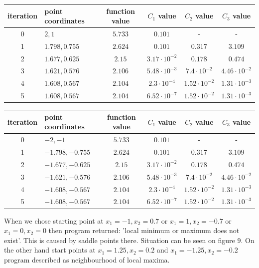 \documentclass[12pt]{article}
\begin{document}
	\begin{table}[H]
		\begin{tabularx}{\textwidth}{c|X|c|c|c|c|}
			iteration & point coordinates & function value & $C_1$ value & $C_2$ value & $C_3$ value\\
			\hline
			0 & $2, 1$ & $5.733$ & $0.101$ & - & - \\
			\hline
			1 & $1.798, 0.755$ & $2.624$ & $0.101$ & $0.317$ & $3.109$ \\
			\hline
			2 & $1.677, 0.625$ & $2.15$ & $3.17\cdot10^{-2}$ & $0.178$ & $0.474$ \\
			\hline
			3 & $1.621, 0.576$ & $2.106$ & $5.48\cdot10^{-3}$ & $7.4\cdot10^{-2}$ & $4.46\cdot10^{-2}$ \\
			\hline
			4 & $1.608, 0.567$ & $2.104$ & $2.3\cdot10^{-4}$ & $1.52\cdot10^{-2}$ & $1.31\cdot10^{-3}$ \\
			\hline
			5 & $1.608, 0.567$ & $2.104$ & $6.52\cdot10^{-7}$ & $1.52\cdot10^{-2}$ & $1.31\cdot10^{-3}$ \\
			\hline
						
 		\end{tabularx}	
	\end{table}

	\begin{table}[H]
		\begin{tabularx}{\textwidth}{c|X|c|c|c|c|}
			iteration & point coordinates & function value & $C_1$ value & $C_2$ value & $C_3$ value\\
			\hline
			0 & $-2, -1$ & $5.733$ & $0.101$ & - & - \\
			\hline
			1 & $-1.798, -0.755$ & $2.624$ & $0.101$ & $0.317$ & $3.109$ \\
			\hline
			2 & $-1.677, -0.625$ & $2.15$ & $3.17\cdot10^{-2}$ & $0.178$ & $0.474$ \\
			\hline
			3 & $-1.621, -0.576$ & $2.106$ & $5.48\cdot10^{-3}$ & $7.4\cdot10^{-2}$ & $4.46\cdot10^{-2}$ \\
			\hline
			4 & $-1.608, -0.567$ & $2.104$ & $2.3\cdot10^{-4}$ & $1.52\cdot10^{-2}$ & $1.31\cdot10^{-3}$ \\
			\hline
			5 & $-1.608, -0.567$ & $2.104$ & $6.52\cdot10^{-7}$ & $1.52\cdot10^{-2}$ & $1.31\cdot10^{-3}$ \\
			\hline		
		\end{tabularx}	
	\end{table}
When we chose starting point at $x_1=-1, x_2=0.7$ or $x_1=1, x_2=-0.7$ or $x_1=0, x_2=0$ then program returned: 'local minimum or maximum does not exist'. This is caused by saddle points there. Situation can be seen on figure 9. On the other hand start points at $x_1=1.25, x_2=0.2$ and $x_1=-1.25, x_2=-0.2$ program described as neighbourhood of local maxima.
	
\end{document}
